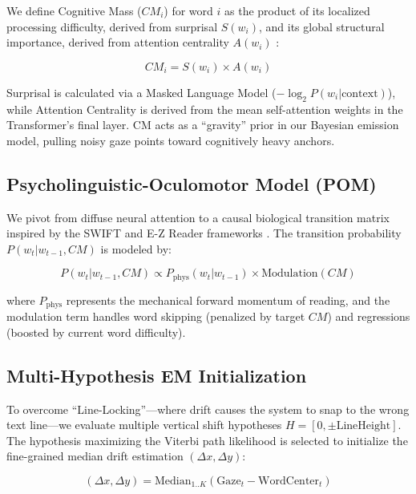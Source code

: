\documentclass{article}
\begin{document}
We define Cognitive Mass ($CM_i$) for word $i$ as the product of its localized processing difficulty, derived from surprisal $S(w_i)$, and its global structural importance, derived from attention centrality $A(w_i)$ \cite{smith2023surprisal, vaswani2017attention}:

\begin{equation}
CM_i = S(w_i) \times A(w_i)
\end{equation}

Surprisal is calculated via a Masked Language Model ($-\log_2 P(w_i | \text{context})$), while Attention Centrality is derived from the mean self-attention weights in the Transformer's final layer. CM acts as a ``gravity'' prior in our Bayesian emission model, pulling noisy gaze points toward cognitively heavy anchors.

\subsection{Psycholinguistic-Oculomotor Model (POM)}

We pivot from diffuse neural attention to a causal biological transition matrix inspired by the SWIFT and E-Z Reader frameworks \cite{engbert2005swift, reichle1998ez}. The transition probability $P(w_t | w_{t-1}, CM)$ is modeled by:

\begin{equation}
P(w_t | w_{t-1}, CM) \propto P_{\text{phys}}(w_t | w_{t-1}) \times \text{Modulation}(CM)
\end{equation}

where $P_{\text{phys}}$ represents the mechanical forward momentum of reading, and the modulation term handles word skipping (penalized by target $CM$) and regressions (boosted by current word difficulty).

\subsection{Multi-Hypothesis EM Initialization}

To overcome ``Line-Locking''—where drift causes the system to snap to the wrong text line—we evaluate multiple vertical shift hypotheses $H = [0, \pm \text{LineHeight}]$. The hypothesis maximizing the Viterbi path likelihood is selected to initialize the fine-grained median drift estimation $(\Delta x, \Delta y)$:

\begin{equation}
(\Delta x, \Delta y) = \text{Median}_{1..K} (\text{Gaze}_t - \text{WordCenter}_t)
\end{equation}
\end{document}
